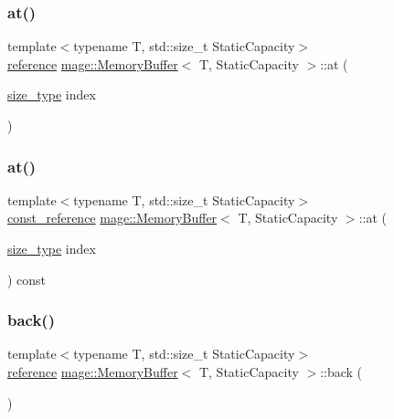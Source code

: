 \subsubsection{\texorpdfstring{at()}{at()}\hspace{0.1cm}{\footnotesize\ttfamily [1/2]}}
{\footnotesize\ttfamily template$<$typename T, std\+::size\+\_\+t Static\+Capacity$>$ \\
\mbox{\hyperlink{classmage_1_1_memory_buffer_ad28560f5391baac5dade220c99d9d62b}{reference}} \mbox{\hyperlink{classmage_1_1_memory_buffer}{mage\+::\+Memory\+Buffer}}$<$ T, Static\+Capacity $>$\+::at (\begin{DoxyParamCaption}\item[{\mbox{\hyperlink{classmage_1_1_memory_buffer_a77b459da2e6f1c57c21467a6eff8e9f9}{size\+\_\+type}}}]{index }\end{DoxyParamCaption})}

\mbox{\label{classmage_1_1_memory_buffer_ace6bbd6b1f71a3310bc3197afe11834e}} 
\subsubsection{\texorpdfstring{at()}{at()}\hspace{0.1cm}{\footnotesize\ttfamily [2/2]}}
{\footnotesize\ttfamily template$<$typename T, std\+::size\+\_\+t Static\+Capacity$>$ \\
\mbox{\hyperlink{classmage_1_1_memory_buffer_aa54883bc0cb483fef570663344f85bb7}{const\+\_\+reference}} \mbox{\hyperlink{classmage_1_1_memory_buffer}{mage\+::\+Memory\+Buffer}}$<$ T, Static\+Capacity $>$\+::at (\begin{DoxyParamCaption}\item[{\mbox{\hyperlink{classmage_1_1_memory_buffer_a77b459da2e6f1c57c21467a6eff8e9f9}{size\+\_\+type}}}]{index }\end{DoxyParamCaption}) const}

\mbox{\label{classmage_1_1_memory_buffer_a7dcdb6998c7faa24a00026d3de795bc9}} 
\subsubsection{\texorpdfstring{back()}{back()}\hspace{0.1cm}{\footnotesize\ttfamily [1/2]}}
{\footnotesize\ttfamily template$<$typename T, std\+::size\+\_\+t Static\+Capacity$>$ \\
\mbox{\hyperlink{classmage_1_1_memory_buffer_ad28560f5391baac5dade220c99d9d62b}{reference}} \mbox{\hyperlink{classmage_1_1_memory_buffer}{mage\+::\+Memory\+Buffer}}$<$ T, Static\+Capacity $>$\+::back (\begin{DoxyParamCaption}{ }\end{DoxyParamCaption})\hspace{0.3cm}{\ttfamily [noexcept]}}

